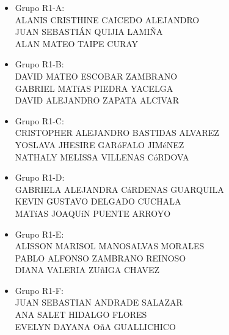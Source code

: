 \documentclass[a4,11pt]{aleph-notas}
\begin{document}
\begin{itemize}
\item
    Grupo R1-A:\\
    	ALANIS CRISTHINE CAICEDO ALEJANDRO\\ JUAN SEBASTIÁN QUIJIA LAMIÑA\\ ALAN MATEO TAIPE CURAY
\item
    Grupo R1-B:\\
    	DAVID MATEO ESCOBAR ZAMBRANO\\ GABRIEL MATíAS PIEDRA YACELGA\\ DAVID ALEJANDRO ZAPATA ALCIVAR
\item
    Grupo R1-C:\\
    	CRISTOPHER ALEJANDRO BASTIDAS ALVAREZ\\ YOSLAVA JHESIRE GARóFALO JIMéNEZ\\ NATHALY MELISSA VILLENAS CóRDOVA
\item
    Grupo R1-D:\\
    	GABRIELA ALEJANDRA CáRDENAS GUARQUILA\\ KEVIN GUSTAVO DELGADO CUCHALA\\ MATíAS JOAQUíN PUENTE ARROYO
\item
    Grupo R1-E:\\
    	ALISSON MARISOL MANOSALVAS MORALES\\ PABLO ALFONSO ZAMBRANO REINOSO\\ DIANA VALERIA ZUñIGA CHAVEZ
\item
    Grupo R1-F:\\
    	JUAN SEBASTIAN ANDRADE SALAZAR\\ ANA SALET HIDALGO FLORES\\ EVELYN DAYANA OñA GUALLICHICO
\end{itemize}
\end{document}
